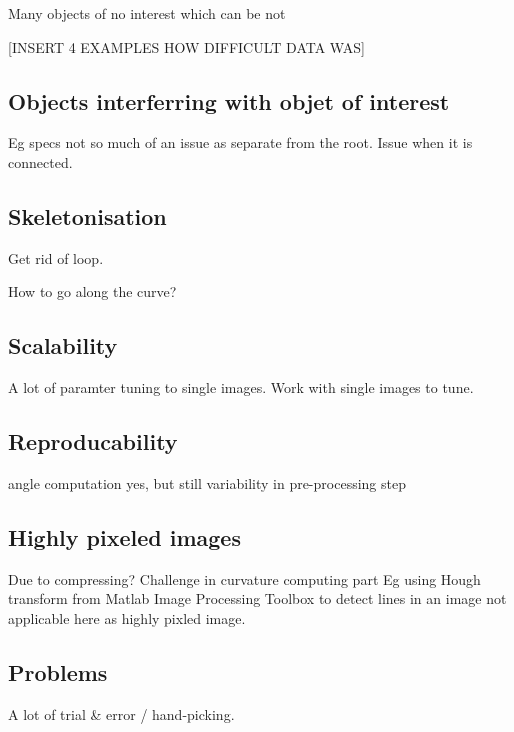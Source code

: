 Many objects of no interest which can be not 


[INSERT 4 EXAMPLES HOW DIFFICULT DATA WAS]


\subsection{Objects interferring with objet of interest}

Eg specs not so much of an issue as separate from the root.
Issue when it is connected.


\subsection{Skeletonisation}
Get rid of loop.

How to go along the curve?


\subsection{Scalability}

A lot of paramter tuning to single images. Work with single images to tune.


\subsection{Reproducability}

angle computation yes, but still variability in pre-processing step


\subsection{Highly pixeled images}
Due to compressing? 
Challenge in curvature computing part
Eg using Hough transform from Matlab Image Processing Toolbox to detect lines in an image not applicable here as highly pixled image.


\subsection{Problems}
A lot of trial \& error / hand-picking. 


